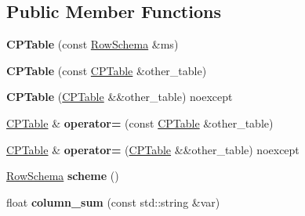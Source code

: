 \subsection*{Public Member Functions}
\begin{DoxyCompactItemize}
\item 
\mbox{\label{structsourbbn_1_1CPTable_a91772bb85dc0edfb3c659730fb1570f8}} 
{\bfseries C\+P\+Table} (const \hyperlink{classsourbbn_1_1RowSchema}{Row\+Schema} \&ms)
\item 
\mbox{\label{structsourbbn_1_1CPTable_a397df7e9d67d895ada6d8c1c99736d3c}} 
{\bfseries C\+P\+Table} (const \hyperlink{structsourbbn_1_1CPTable}{C\+P\+Table} \&other\+\_\+table)
\item 
\mbox{\label{structsourbbn_1_1CPTable_a2951c4f0b57373b338e0a5859f730d9c}} 
{\bfseries C\+P\+Table} (\hyperlink{structsourbbn_1_1CPTable}{C\+P\+Table} \&\&other\+\_\+table) noexcept
\item 
\mbox{\label{structsourbbn_1_1CPTable_a7ecc27010fb8e1754a9b82c3d760790e}} 
\hyperlink{structsourbbn_1_1CPTable}{C\+P\+Table} \& {\bfseries operator=} (const \hyperlink{structsourbbn_1_1CPTable}{C\+P\+Table} \&other\+\_\+table)
\item 
\mbox{\label{structsourbbn_1_1CPTable_a40b09f0f86067fd7cccefae925012ee5}} 
\hyperlink{structsourbbn_1_1CPTable}{C\+P\+Table} \& {\bfseries operator=} (\hyperlink{structsourbbn_1_1CPTable}{C\+P\+Table} \&\&other\+\_\+table) noexcept
\item 
\mbox{\label{structsourbbn_1_1CPTable_aff3f0def2ea100b7468709e0e0b69f41}} 
\hyperlink{classsourbbn_1_1RowSchema}{Row\+Schema} {\bfseries scheme} ()
\item 
\mbox{\label{structsourbbn_1_1CPTable_aea66324ae4cb8f0b6ae2d847a1832c7f}} 
float {\bfseries column\+\_\+sum} (const std\+::string \&var)
\end{DoxyCompactItemize}
